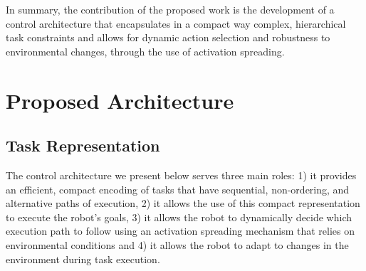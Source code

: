 \documentclass[conference]{article}
\begin{document}
In summary, the contribution of the proposed work is the development of a control architecture that encapsulates in a compact way complex, hierarchical task constraints and allows for dynamic action selection and robustness to environmental changes, through the use of activation spreading.

\section{Proposed Architecture}
\label{architecture}
\subsection{Task Representation}
\label{representation}
The control architecture we present below serves three main roles: 1) it provides an efficient, compact encoding of tasks that have sequential, non-ordering, and alternative paths of execution, 2) it allows the use of this compact representation to execute the robot's goals, 3) it allows the robot to dynamically decide which execution path to follow using an activation spreading mechanism that relies on environmental conditions and 4) it allows the robot to adapt to changes in the environment during task execution.
\end{document}
